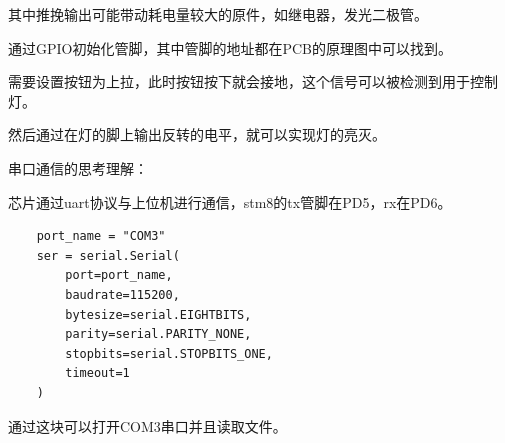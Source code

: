 \documentclass{ctexart}
\begin{document}
其中推挽输出可能带动耗电量较大的原件，如继电器，发光二极管。

通过GPIO初始化管脚，其中管脚的地址都在PCB的原理图中可以找到。

需要设置按钮为上拉，此时按钮按下就会接地，这个信号可以被检测到用于控制灯。

然后通过在灯的脚上输出反转的电平，就可以实现灯的亮灭。

串口通信的思考理解：

芯片通过uart协议与上位机进行通信，stm8的tx管脚在PD5，rx在PD6。

\begin{lstlisting}
    port_name = "COM3"
    ser = serial.Serial(
        port=port_name,
        baudrate=115200,
        bytesize=serial.EIGHTBITS,
        parity=serial.PARITY_NONE,
        stopbits=serial.STOPBITS_ONE,
        timeout=1
    )
\end{lstlisting}
通过这块可以打开COM3串口并且读取文件。
\end{document}

